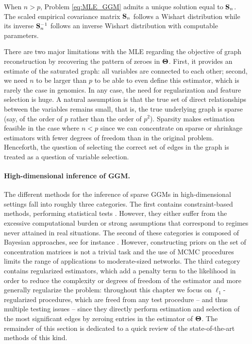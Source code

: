 When $n>p$, Problem \eqref{eq:MLE_GGM}  admits a unique solution equal
to  $\mathbf{S}_n$.   The  scaled  empirical  covariance  matrix  $\mathbf{S}_n$
follows  a  Wishart  distribution  while  its  inverse  $\mathbf{S}_n^{-1}$
follows an inverse Wishart distribution with computable parameters.

There are two  major limitations with the MLE  regarding the objective
of  graph  reconstruction  by  recovering the  pattern  of  zeroes  in
$\boldsymbol\Theta$. First, it provides an  estimate of the saturated graph: all
variables  are connected  to each  other; second,  we need  $n$ to  be
larger than  $p$ to be  able to even  define this estimator,  which is
rarely the case in genomics. In  any case, the need for regularization
and feature selection is huge.  A  natural assumption is that the true
set of direct relationships between  the variables remains small, that
is, the  true underlying  graph is  sparse (say, of  the order  of $p$
rather than the  order of $p^2$).  Sparsity  makes estimation feasible
in  the  case where  $n<p$  since  we  can  concentrate on  sparse  or
shrinkage  estimators  with  fewer  degrees of  freedom  than  in  the
original problem.   Henceforth, the question of  selecting the correct
set  of edges  in  the graph  is  treated as  a  question of  variable
selection.

\paragraph*{High-dimensional inference of GGM.}  The different methods
for the inference of sparse GGMs in high-dimensional settings fall
into roughly three categories.  The first contains constraint-based
methods, performing statistical tests
\cite{2006_JMLR_Castelo,2007_SS_drton,2008_JSPI_drton,2011_BMC_Kiiveri,2006_SAGMB_Wille}.
However, they either suffer from the excessive computational burden
\cite{2006_JMLR_Castelo,2006_SAGMB_Wille} or strong assumptions
\cite{2007_SS_drton,2008_JSPI_drton} that correspond to regimes never
attained in real situations.  The second of these categories is
composed of Bayesian approaches, see for instance
\cite{2004_JMVA_Dobra,2005_SS_Dobra,rau2012reverse,schwaller2015tree}.
However, constructing priors on the set of concentration matrices is
not a trivial task and the use of MCMC procedures limits the range of
applications to moderate-sized networks.  The third category contains
regularized estimators, which add a penalty term to the likelihood in
order to reduce the complexity or degrees of freedom of the estimator
and more generally regularize the problem: throughout this chapter we
focus on $\ell_1$-regularized procedures, which are freed from any
test procedure -- and thus multiple testing issues -- since they
directly perform estimation and selection of the most significant
edges by zeroing entries in the estimator of $\boldsymbol\Theta$.  The remainder
of this section is dedicated to a quick review of the state-of-the-art
methods of this kind.

